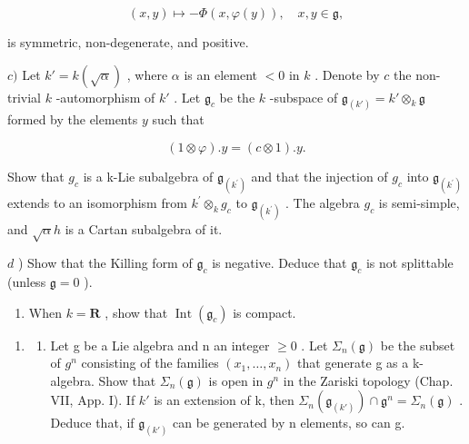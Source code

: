 \[
(x, y) \mapsto - \Phi (x, \varphi (y)), \quad x, y \in \mathfrak {g},
\]

is symmetric, non-degenerate, and positive.

\(c)\) Let \(k' = k(\sqrt{\alpha})\) , where \(\alpha\) is an element \(< 0\) in \(k\) . Denote by \(c\) the non-trivial \(k\) -automorphism of \(k'\) . Let \(\mathfrak{g}_c\) be the \(k\) -subspace of \(\mathfrak{g}_{(k')} = k' \otimes_k \mathfrak{g}\) formed by the elements \(y\) such that

\[
(1 \otimes \varphi). y = (c \otimes 1). y.
\]

Show that \(g_{c}\) is a k-Lie subalgebra of \(\mathfrak{g}_{(k^{\prime})}\) and that the injection of \(g_{c}\) into \(\mathfrak{g}_{(k^{\prime})}\) extends to an isomorphism from \(k^{\prime}\otimes_{k}g_{c}\) to \(\mathfrak{g}_{(k^{\prime})}\) . The algebra \(g_{c}\) is semi-simple, and \(\sqrt{\alpha}h\) is a Cartan subalgebra of it.

\(d\) ) Show that the Killing form of \(\mathfrak{g}_c\) is negative. Deduce that \(\mathfrak{g}_c\) is not splittable (unless \(\mathfrak{g} = 0\) ).

\begin{enumerate}
\def\labelenumi{\alph{enumi})}
\setcounter{enumi}{4}
\tightlist
\item
  When \(k = \mathbf{R}\) , show that \(\operatorname{Int}(\mathfrak{g}_c)\) is compact.
\end{enumerate}

\begin{enumerate}
\def\labelenumi{\arabic{enumi})}
\setcounter{enumi}{7}
\tightlist
\item
  \begin{enumerate}
  \def\labelenumii{\alph{enumii})}
  \tightlist
  \item
    Let g be a Lie algebra and n an integer \(\geq 0\) . Let \(\Sigma_{n}(\mathfrak{g})\) be the subset of \(g^{n}\) consisting of the families \((x_{1},\ldots,x_{n})\) that generate g as a k-algebra. Show that \(\Sigma_{n}(\mathfrak{g})\) is open in \(g^{n}\) in the Zariski topology (Chap. VII, App. I). If \(k'\) is an extension of k, then \(\Sigma_{n}(\mathfrak{g}_{(k')})\cap\mathfrak{g}^{n}=\Sigma_{n}(\mathfrak{g})\) . Deduce that, if \(\mathfrak{g}_{(k')}\) can be generated by n elements, so can g.
  \end{enumerate}
\end{enumerate}

